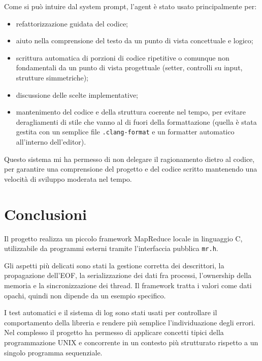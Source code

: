 \documentclass[11pt,a4paper]{article}
\begin{document}
Come si può intuire dal system prompt, l'agent è stato usato principalmente per:

\begin{itemize}
    \item refattorizzazione guidata del codice;
    \item aiuto nella comprensione del testo da un punto di vista concettuale e logico;
    \item scrittura automatica di porzioni di codice ripetitive o comunque non fondamentali da un punto di vista progettuale (setter, controlli su input, strutture simmetriche);
    \item discussione delle scelte implementative;
    \item mantenimento del codice e della struttura coerente nel tempo, per evitare deragliamenti di stile che vanno al di fuori della formattazione (quella è stata gestita con un semplice file \texttt{.clang-format} e un formatter automatico all'interno dell'editor).
\end{itemize}

Questo sistema mi ha permesso di non delegare il ragionamento dietro al codice, per garantire una comprensione del progetto e del codice scritto mantenendo una velocità di sviluppo moderata nel tempo.

\section{Conclusioni}

Il progetto realizza un piccolo framework MapReduce locale in linguaggio C, utilizzabile da programmi esterni tramite l'interfaccia pubblica \texttt{mr.h}.

Gli aspetti più delicati sono stati la gestione corretta dei descrittori, la propagazione dell'EOF, la serializzazione dei dati fra processi, l'ownership della memoria e la sincronizzazione dei thread. Il framework tratta i valori come dati opachi, quindi non dipende da un esempio specifico.

I test automatici e il sistema di log sono stati usati per controllare il comportamento della libreria e rendere più semplice l'individuazione degli errori. Nel complesso il progetto ha permesso di applicare concetti tipici della programmazione UNIX e concorrente in un contesto più strutturato rispetto a un singolo programma sequenziale.
\end{document}
